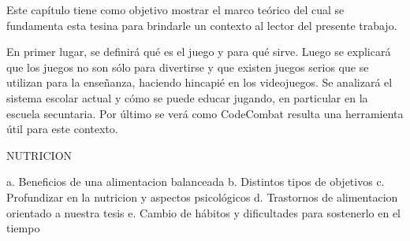 Este capítulo tiene como objetivo mostrar el marco teórico del cual se fundamenta esta tesina para brindarle un contexto al lector del presente trabajo. 

En primer lugar, se definirá qué es el juego y para qué sirve. Luego se explicará que los juegos no son sólo para divertirse y que existen juegos serios que se utilizan para la enseñanza, haciendo hincapié en los videojuegos. Se analizará el sistema escolar actual y cómo se puede educar jugando, en particular en la escuela secuntaria. Por último se verá como CodeCombat resulta una herramienta útil para este contexto.


NUTRICION 

	a. Beneficios de una alimentacion balanceada
	b. Distintos tipos de objetivos
	c. Profundizar en la nutricion y aspectos psicológicos
    d. Trastornos de alimentacion orientado a nuestra tesis
    e. Cambio de hábitos y dificultades para sostenerlo en el tiempo
